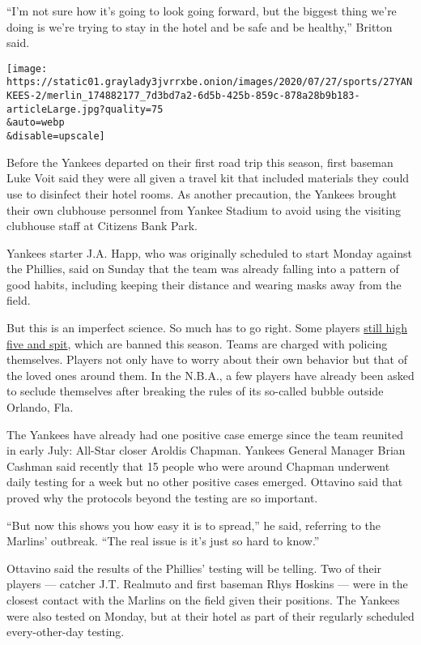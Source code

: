 ``I'm not sure how it's going to look going forward, but the biggest
thing we're doing is we're trying to stay in the hotel and be safe and
be healthy,'' Britton said.

\texttt{[image: https://static01.graylady3jvrrxbe.onion/images/2020/07/27/sports/27YANKEES-2/merlin\_174882177\_7d3bd7a2-6d5b-425b-859c-878a28b9b183-articleLarge.jpg?quality=75\\\&auto=webp\\\&disable=upscale]}

Before the Yankees departed on their first road trip this season, first
baseman Luke Voit said they were all given a travel kit that included
materials they could use to disinfect their hotel rooms. As another
precaution, the Yankees brought their own clubhouse personnel from
Yankee Stadium to avoid using the visiting clubhouse staff at Citizens
Bank Park.

Yankees starter J.A. Happ, who was originally scheduled to start Monday
against the Phillies, said on Sunday that the team was already falling
into a pattern of good habits, including keeping their distance and
wearing masks away from the field.

But this is an imperfect science. So much has to go right. Some players
\href{https://www.nytimes3xbfgragh.onion/2020/07/17/sports/baseball/baseball-mlb-coronavirus-spitting.html}{still
high five and spit}, which are banned this season. Teams are charged
with policing themselves. Players not only have to worry about their own
behavior but that of the loved ones around them. In the N.B.A., a few
players have already been asked to seclude themselves after breaking the
rules of its so-called bubble outside Orlando, Fla.

The Yankees have already had one positive case emerge since the team
reunited in early July: All-Star closer Aroldis Chapman. Yankees General
Manager Brian Cashman said recently that 15 people who were around
Chapman underwent daily testing for a week but no other positive cases
emerged. Ottavino said that proved why the protocols beyond the testing
are so important.

``But now this shows you how easy it is to spread,'' he said, referring
to the Marlins' outbreak. ``The real issue is it's just so hard to
know.''

Ottavino said the results of the Phillies' testing will be telling. Two
of their players --- catcher J.T. Realmuto and first baseman Rhys
Hoskins --- were in the closest contact with the Marlins on the field
given their positions. The Yankees were also tested on Monday, but at
their hotel as part of their regularly scheduled every-other-day
testing.

